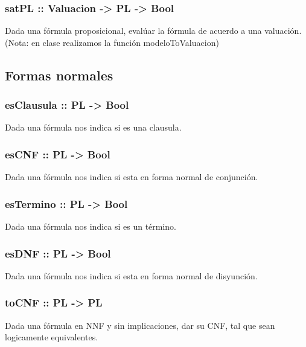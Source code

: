 \documentclass[11pt]{article}
\begin{document}
\subsubsection{satPL :: Valuacion -> PL -> Bool}
\label{sec:orga272c75}
Dada una fórmula proposicional, evalúar la fórmula de acuerdo a una valuación.\\
(Nota: en clase realizamos la función modeloToValuacion)
\subsection{Formas normales}
\label{sec:org9df0563}
\subsubsection{esClausula :: PL -> Bool}
\label{sec:org344e232}
Dada una fórmula nos indica si es una clausula.
\subsubsection{esCNF :: PL -> Bool}
\label{sec:orgfc834b5}
Dada una fórmula nos indica si esta en forma normal de conjunción.
\subsubsection{esTermino :: PL -> Bool}
\label{sec:org8661a2d}
Dada una fórmula nos indica si es un término.
\subsubsection{esDNF :: PL -> Bool}
\label{sec:org133e3a2}
Dada una fórmula nos indica si esta en forma normal de disyunción.
\subsubsection{toCNF :: PL -> PL}
\label{sec:org2f172dd}
Dada una fórmula en NNF y sin implicaciones, dar su CNF, tal que sean logicamente equivalentes.
\end{document}

